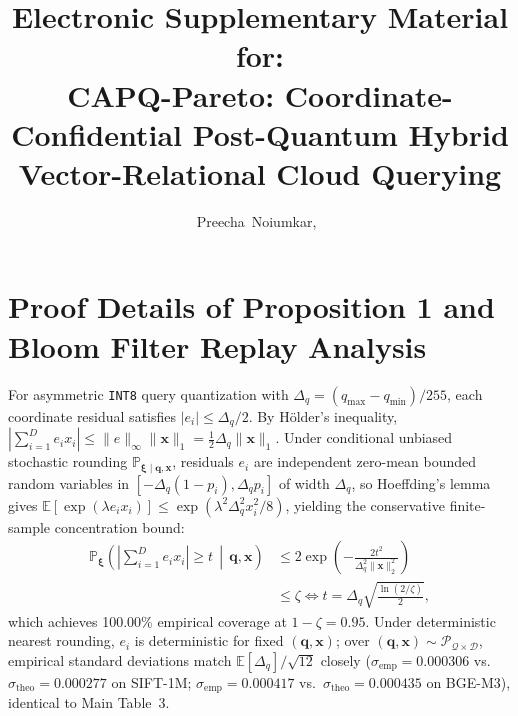 \documentclass[10pt,journal,compsoc]{IEEEtran}
\begin{document}
\title{Electronic Supplementary Material for:\\CAPQ-Pareto: Coordinate-Confidential Post-Quantum Hybrid Vector-Relational Cloud Querying}
\author{Preecha~Noiumkar,~}
\maketitle

\section{Proof Details of Proposition 1 and Bloom Filter Replay Analysis}
For asymmetric \texttt{INT8} query quantization with $\Delta_q = (q_{\max}-q_{\min})/255$, each coordinate residual satisfies $|e_i| \le \Delta_q/2$. By H\"older's inequality, $|\sum_{i=1}^D e_i x_i| \le \|e\|_\infty \|\mathbf{x}\|_1 = \frac{1}{2}\Delta_q \|\mathbf{x}\|_1$. Under conditional unbiased stochastic rounding $\mathbb{P}_{\boldsymbol{\xi}\mid\mathbf{q},\mathbf{x}}$, residuals $e_i$ are independent zero-mean bounded random variables in $[-\Delta_q(1-p_i), \Delta_q p_i]$ of width $\Delta_q$, so Hoeffding's lemma gives $\mathbb{E}[\exp(\lambda e_i x_i)] \le \exp(\lambda^2 \Delta_q^2 x_i^2 / 8)$, yielding the conservative finite-sample concentration bound:
\begin{align}
\mathbb{P}_{\boldsymbol{\xi}}\!\left(\left|\sum_{i=1}^D e_i x_i\right| \ge t \,\middle|\, \mathbf{q},\mathbf{x}\right)
&\le 2\exp\!\left(-\frac{2t^2}{\Delta_q^2 \|\mathbf{x}\|_2^2}\right) \nonumber\\
&\le \zeta \iff t = \Delta_q \sqrt{\frac{\ln(2/\zeta)}{2}},
\end{align}
which achieves 100.00\% empirical coverage at $1-\zeta = 0.95$. Under deterministic nearest rounding, $e_i$ is deterministic for fixed $(\mathbf{q},\mathbf{x})$; over $(\mathbf{q},\mathbf{x}) \sim \mathcal{P}_{\mathcal{Q}\times\mathcal{D}}$, empirical standard deviations match $\mathbb{E}[\Delta_q]/\sqrt{12}$ closely ($\sigma_{\text{emp}} = 0.000306$ vs.\ $\sigma_{\text{theo}} = 0.000277$ on SIFT-1M; $\sigma_{\text{emp}} = 0.000417$ vs.\ $\sigma_{\text{theo}} = 0.000435$ on BGE-M3), identical to Main Table~3.
\end{document}

